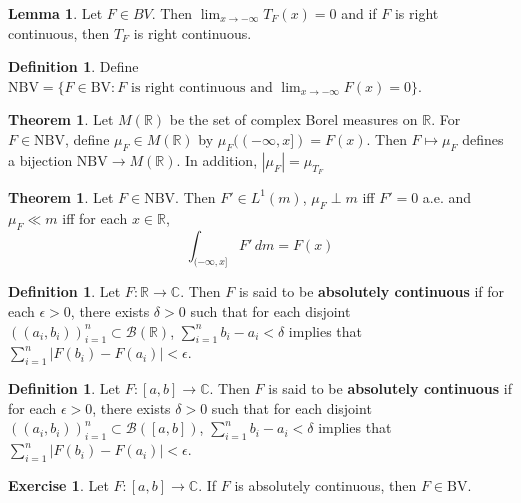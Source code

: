 \documentclass[12pt]{amsart}
\theoremstyle{definition}
\newtheorem{defn}[definition]{Definition}
\newtheorem{thm}[definition]{Theorem}
\newtheorem{lem}[definition]{Lemma}
\newtheorem{ex}[definition]{Exercise}
\newcommand{\del}{\delta}
\newcommand{\ep}{\epsilon}
\newcommand{\C}{\mathbb{C}}
\newcommand{\R}{\mathbb{R}}
\newcommand{\MB}{\mathcal{B}}
\newcommand{\dm}{\, d m}
\newcommand{\BV}{\text{BV}}
\newcommand{\NBV}{\text{NBV}}
\newcommand{\lex}[1]{\label{ex:#1}}
\newcommand{\ld}[1]{\label{defn:#1}}
\begin{document}
	\begin{lem}
		Let $F \in BV$. Then $\lim_{x \rightarrow -\infty}T_F(x)=0$ and if $F$ is right continuous, then $T_F$ is right continuous.
	\end{lem}
	
	\begin{defn} \ld{00000} 
		Define $\NBV=\{F \in \BV: F \text{ is right continuous and }\lim_{x \rightarrow -\infty}F(x)=0\}$.
	\end{defn}
	
	\begin{thm}
		Let $M(\R)$ be the set of complex Borel measures on $\R$. For $F \in \NBV$, define $\mu_F \in M(\R)$ by $\mu_F((-\infty, x]) = F(x)$. Then $F \mapsto \mu_F$ defines a bijection $\NBV \rightarrow M(\R)$. In addition, $|\mu_F| = \mu_{T_F}$
	\end{thm}
	
	\begin{thm}
		Let $F \in \NBV$. Then $F' \in L^1(m)$, $\mu_F \perp m$ iff $F' =0$ a.e. and $\mu_F \ll m$ iff for each $x \in \R$, $$\int_{(-\infty, x]}F'\dm = F(x)$$
	\end{thm}
	
	\begin{defn} \ld{00000} 
		Let $F: \R \rightarrow \C$. Then $F$ is said to be \textbf{absolutely continuous} if for each $\ep>0$, there exists $\del>0$ such that for each disjoint $((a_i, b_i))_{i=1}^n \subset \MB(\R)$, $\sum_{i=1}^n b_i-a_i < \del$ implies that $\sum_{i=1}^n|F(b_i)-F(a_i)| < \ep$.
	\end{defn}
	
	\begin{defn} \ld{00000} 
		Let $F: [a,b] \rightarrow \C$. Then $F$ is said to be \textbf{absolutely continuous} if for each $\ep>0$, there exists $\del>0$ such that for each disjoint $((a_i, b_i))_{i=1}^n \subset \MB([a,b])$, $\sum_{i=1}^n b_i-a_i < \del$ implies that $\sum_{i=1}^n|F(b_i)-F(a_i)| < \ep$.
	\end{defn}
	
	\begin{ex} \lex{00000} 
		Let $F:[a,b] \rightarrow \C$. If $F$ is absolutely continuous, then $F \in \BV$.
	\end{ex}
	
\end{document}

